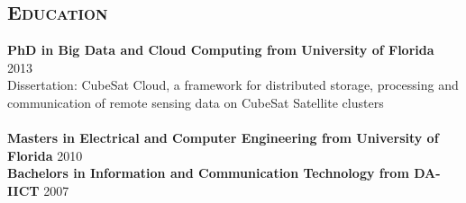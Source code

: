 \begin{resume}
\section{\textsc{Education}}
\textbf{PhD in Big Data and Cloud Computing from University of Florida} \hfill 2013 \\
Dissertation: CubeSat Cloud, a framework for distributed storage, processing and communication of remote sensing data on CubeSat Satellite clusters\\ \\
\textbf{Masters in Electrical and Computer Engineering from University of Florida} \hfill 2010 \\
\textbf{Bachelors in Information and Communication Technology from DA-IICT} \hfill 2007

\begin{formatb}
  \\
  \body\\
\end{formatb}


\end{resume}
